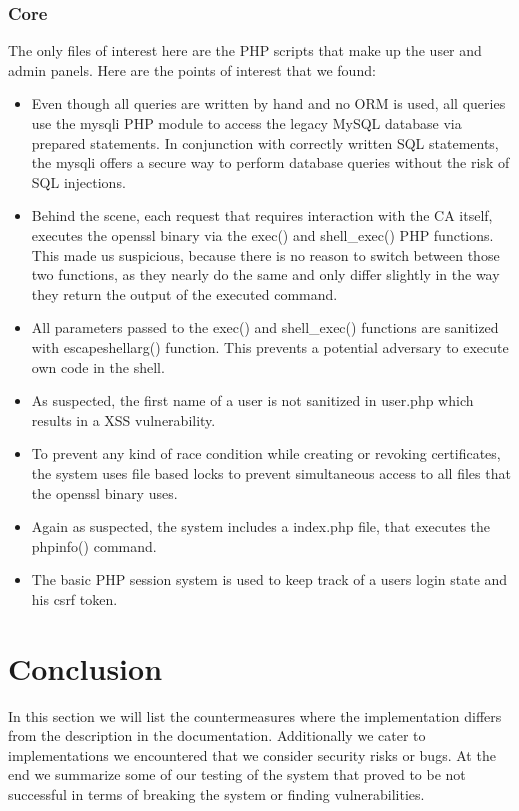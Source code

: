 \documentclass{article}
\begin{document}
\subsubsection{Core}
The only files of interest here are the PHP scripts that make up the user and admin panels. Here are the points of interest that we found:
\begin{itemize}
\item Even though all queries are written by hand and no ORM is used, all queries use the mysqli PHP module to access the legacy MySQL database via prepared statements. In conjunction with correctly written SQL statements, the mysqli offers a secure way to perform database queries without the risk of SQL injections.
\item Behind the scene, each request that requires interaction with the CA itself, executes the openssl binary via the exec() and shell\_exec() PHP functions. This made us suspicious, because there is no reason to switch between those two functions, as they nearly do the same and only differ slightly in the way they return the output of the executed command.
\item All parameters passed to the exec() and shell\_exec() functions are sanitized with escapeshellarg() function. This prevents a potential adversary to execute own code in the shell.
\item As suspected, the first name of a user is not sanitized in user.php which results in a XSS vulnerability.
\item To prevent any kind of race condition while creating or revoking certificates, the system uses file based locks to prevent simultaneous access to all files that the openssl binary uses.
\item Again as suspected, the system includes a index.php file, that executes the phpinfo() command.
\item The basic PHP session system is used to keep track of a users login state and his csrf token.
\end{itemize}

\section{Conclusion}
In this section we will list the countermeasures where the implementation differs from the description in the documentation. Additionally we cater to implementations we encountered that we consider security risks or bugs. At the end we summarize some of our testing of the system that proved to be not successful in terms of breaking the system or finding vulnerabilities.
\end{document}
